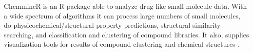 ChemmineR is an R package able to analyze drug-like small molecule data. With a wide spectrum of algorithms it can process large numbers of small molecules, do physicochemical/structural property predictions, structural similarity searching, and classification and clustering of compound libraries. It also, supplies visualization tools for results of compound clustering and chemical structures \cite{Cao_2008}.